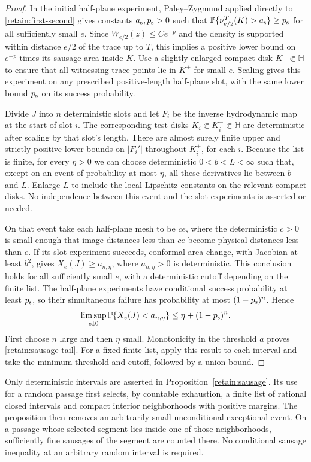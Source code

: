 \begin{proof}
In the initial half-plane experiment, Paley--Zygmund applied directly
to \eqref{retain:first-second} gives constants $a_{\rm s},p_{\rm s}>0$
such that $\mathbb P\{\nu_{e/2}^T(K)>a_{\rm s}\}\ge p_{\rm s}$
for all sufficiently small $e$.  Since
$W_{e/2}(z)\le Ce^{-p}$ and the density is supported within distance
$e/2$ of the trace up to $T$, this implies a positive lower bound on
$e^{-p}$ times its sausage area inside $K$.  Use a slightly enlarged
compact disk $K^+\Subset\mathbb H$ to ensure that all witnessing
trace points lie in $K^+$ for small $e$.  Scaling gives this
experiment on any prescribed positive-length half-plane slot,
with the same lower bound $p_{\rm s}$ on its success probability.

Divide $J$ into $n$ deterministic slots and let $F_i$ be the inverse
hydrodynamic map at the start of slot $i$.  The corresponding test
disks $K_i\Subset K_i^+\Subset\mathbb H$ are deterministic after
scaling by that slot's length.  There are almost surely finite upper
and strictly positive lower bounds on $|F_i'|$ throughout $K_i^+$,
for each $i$.  Because the list is finite, for every $\eta>0$ we can
choose deterministic $0<b<L<\infty$ such that, except on an event
of probability at most $\eta$, all these derivatives lie between
$b$ and $L$.  Enlarge $L$ to include the local Lipschitz constants on
the relevant compact disks.  No independence between this event and
the slot experiments is asserted or needed.

On that event take each half-plane mesh to be $ce$, where the
deterministic $c>0$ is small enough that image distances less than
$ce$ become physical distances less than $e$.  If its slot
experiment succeeds, conformal area change, with Jacobian at least
$b^2$, gives $X_e(J)\ge a_{n,\eta}$, where $a_{n,\eta}>0$ is
deterministic.  This conclusion holds for all sufficiently small
$e$, with a deterministic cutoff depending on the finite list.
The half-plane experiments have conditional success probability at
least $p_{\rm s}$, so their simultaneous failure has probability at most
$(1-p_{\rm s})^n$.  Hence
\[
 \limsup_{e\downarrow0}\mathbb P\{X_e(J)<a_{n,\eta}\}
 \le\eta+(1-p_{\rm s})^n.
\]
First choose $n$ large and then $\eta$ small.  Monotonicity in the
threshold $a$ proves \eqref{retain:sausage-tail}.  For a fixed finite
list, apply this result to each interval and take the minimum
threshold and cutoff, followed by a union bound.
\end{proof}

Only deterministic intervals are asserted in
Proposition~\ref{retain:sausage}.  Its use for a random passage first
selects, by countable exhaustion, a finite list of rational closed
intervals and compact interior neighborhoods with positive margins.
The proposition then removes an arbitrarily small unconditional
exceptional event.  On a passage whose selected segment lies inside
one of those neighborhoods, sufficiently fine sausages of the segment
are counted there.  No conditional sausage inequality at an arbitrary
random interval is required.
